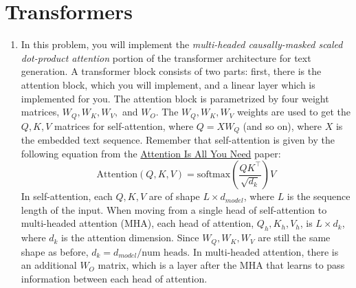 \documentclass{article}
\begin{document}
\newpage
\section*{Transformers}

\begin{aprob}
\begin{enumerate}
\item {} In this problem, you will implement the \textit{multi-headed causally-masked scaled dot-product attention} portion of the transformer architecture for text generation. A transformer block consists of two parts: first, there is the attention block, which you will implement, and a linear layer which is implemented for you. The attention block is parametrized by four weight matrices, $W_Q, W_K, W_V,$ and $W_O$. The $W_Q, W_K, W_V$ weights are used to get the $Q, K, V$ matrices for self-attention, where $Q = XW_Q$ (and so on), where $X$ is the embedded text sequence. Remember that self-attention is given by the following equation from the \href{https://arxiv.org/abs/1706.03762}{Attention Is All You Need} paper:
\begin{equation}
    \text{Attention}(Q, K, V ) = \text{softmax} \left(\frac{QK^\top}{\sqrt{d_k}} \right)V
\end{equation}
In self-attention, each $Q, K, V$ are of shape $L \times d_{model}$, where $L$ is the sequence length of the input. When moving from a single head of self-attention to multi-headed attention (MHA), each head of attention, $Q_h, K_h, V_h$, is $L \times d_k$, where $d_k$ is the attention dimension. Since $W_Q, W_K, W_V$ are still the same shape as before, $d_k = d_{model} / \text{num heads}$. In multi-headed attention, there is an additional $W_O$ matrix, which is a layer after the MHA that learns to pass information between each head of attention. \\


\end{enumerate}
\end{aprob}
\end{document}
